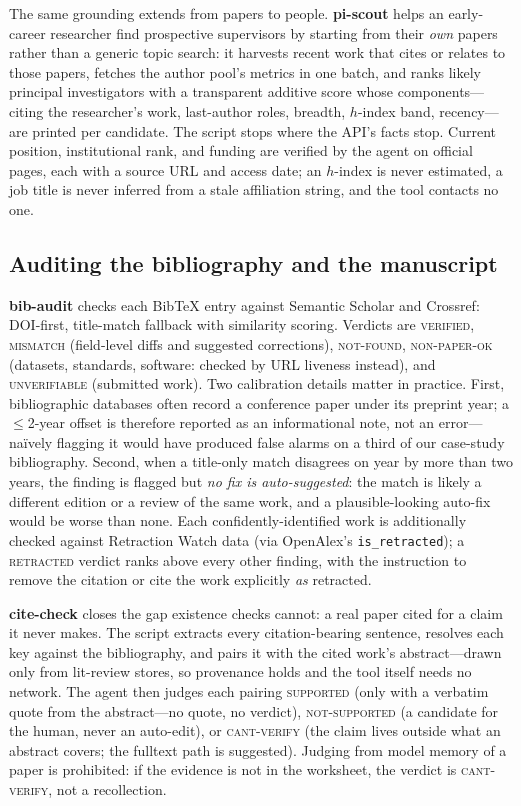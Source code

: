 \documentclass[11pt]{article}
\begin{document}
The same grounding extends from papers to people. \textbf{pi-scout} helps an
early-career researcher find prospective supervisors by starting from their
\emph{own} papers rather than a generic topic search: it harvests recent work
that cites or relates to those papers, fetches the author pool's metrics in
one batch, and ranks likely principal investigators with a transparent
additive score whose components---citing the researcher's work, last-author
roles, breadth, $h$-index band, recency---are printed per candidate. The
script stops where the API's facts stop. Current position, institutional rank,
and funding are verified by the agent on official pages, each with a source
URL and access date; an $h$-index is never estimated, a job title is never
inferred from a stale affiliation string, and the tool contacts no one.

\subsection{Auditing the bibliography and the manuscript}
\label{sec:audit}

\textbf{bib-audit} checks each BibTeX entry against Semantic Scholar and
Crossref: DOI-first, title-match fallback with similarity scoring. Verdicts
are \textsc{verified}, \textsc{mismatch} (field-level diffs and suggested
corrections), \textsc{not-found}, \textsc{non-paper-ok} (datasets, standards,
software: checked by URL liveness instead), and \textsc{unverifiable}
(submitted work). Two calibration details matter in practice. First,
bibliographic databases often record a conference paper under its preprint
year; a $\le$2-year offset is therefore reported as an informational note, not
an error---na\"ively flagging it would have produced false alarms on a third
of our case-study bibliography. Second, when a title-only match disagrees on
year by more than two years, the finding is flagged but \emph{no fix is
auto-suggested}: the match is likely a different edition or a review of the
same work, and a plausible-looking auto-fix would be worse than none. Each
confidently-identified work is additionally checked against Retraction Watch
data (via OpenAlex's \texttt{is\_retracted}); a \textsc{retracted} verdict
ranks above every other finding, with the instruction to remove the citation
or cite the work explicitly \emph{as} retracted.

\textbf{cite-check} closes the gap existence checks cannot: a real paper cited
for a claim it never makes. The script extracts every citation-bearing
sentence, resolves each key against the bibliography, and pairs it with the
cited work's abstract---drawn only from lit-review stores, so provenance
holds and the tool itself needs no network. The agent then judges each pairing
\textsc{supported} (only with a verbatim quote from the abstract---no quote,
no verdict), \textsc{not-supported} (a candidate for the human, never an
auto-edit), or \textsc{cant-verify} (the claim lives outside what an abstract
covers; the fulltext path is suggested). Judging from model memory of a paper
is prohibited: if the evidence is not in the worksheet, the verdict is
\textsc{cant-verify}, not a recollection.
\end{document}
